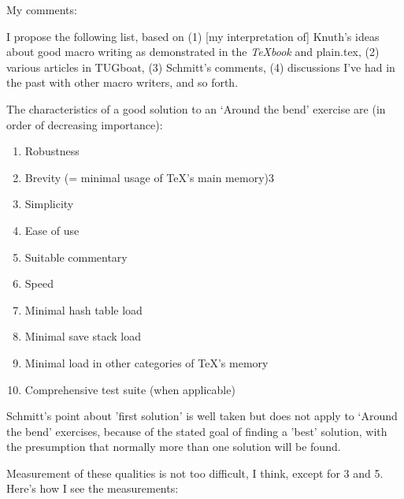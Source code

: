My comments:

I propose the following list, based on (1) [my interpretation of]
Knuth's ideas about good macro writing as demonstrated in the \emph{TeXbook}
and plain.tex, (2) various articles in TUGboat, (3) Schmitt's comments,
(4) discussions I've had in the past with other macro writers, and so
forth.

The characteristics of a good solution to an `Around the bend' exercise
are (in order of decreasing importance):

\begin{enumerate}
\item Robustness
\item Brevity (= minimal usage of TeX's main memory)3
\item Simplicity
\item  Ease of use
\item  Suitable commentary
\item  Speed
\item  Minimal hash table load
\item  Minimal save stack load
\item  Minimal load in other categories of TeX's memory
\item  Comprehensive test suite (when applicable)
\end{enumerate}
Schmitt's point about 'first solution' is well taken 
but does not apply
to `Around the bend' exercises, because of the stated goal of finding a
'best' solution, with the presumption that normally more than one
solution will be found.

Measurement of these qualities is not too difficult, I think,
except for 3 and 5. Here's how I see the measurements:

